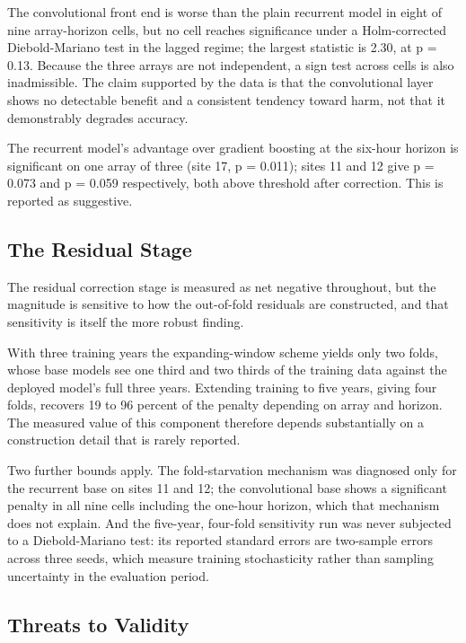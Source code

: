 The convolutional front end is worse than the plain recurrent model in
eight of nine array-horizon cells, but no cell reaches significance
under a Holm-corrected Diebold-Mariano test in the lagged regime; the
largest statistic is 2.30, at p = 0.13. Because the three arrays are not
independent, a sign test across cells is also inadmissible. The claim
supported by the data is that the convolutional layer shows no
detectable benefit and a consistent tendency toward harm, not that it
demonstrably degrades accuracy.

The recurrent model's advantage over gradient boosting at the six-hour
horizon is significant on one array of three (site 17, p = 0.011);
sites 11 and 12 give p = 0.073 and p = 0.059 respectively, both above
threshold after correction. This is reported as suggestive.

\subsection{The Residual Stage}

The residual correction stage is measured as net negative throughout,
but the magnitude is sensitive to how the out-of-fold residuals are
constructed, and that sensitivity is itself the more robust finding.

With three training years the expanding-window scheme yields only two
folds, whose base models see one third and two thirds of the training
data against the deployed model's full three years. Extending training
to five years, giving four folds, recovers 19 to 96 percent of the
penalty depending on array and horizon. The measured value of this
component therefore depends substantially on a construction detail that
is rarely reported.

Two further bounds apply. The fold-starvation mechanism was diagnosed
only for the recurrent base on sites 11 and 12; the convolutional base
shows a significant penalty in all nine cells including the one-hour
horizon, which that mechanism does not explain. And the five-year,
four-fold sensitivity run was never subjected to a Diebold-Mariano test:
its reported standard errors are two-sample errors across three seeds,
which measure training stochasticity rather than sampling uncertainty in
the evaluation period.

\subsection{Threats to Validity}

